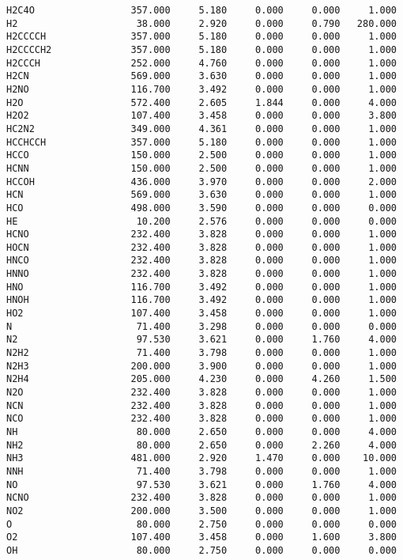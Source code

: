\begin{verbatim}
H2C4O                 357.000     5.180     0.000     0.000     1.000
H2                     38.000     2.920     0.000     0.790   280.000
H2CCCCH               357.000     5.180     0.000     0.000     1.000
H2CCCCH2              357.000     5.180     0.000     0.000     1.000
H2CCCH                252.000     4.760     0.000     0.000     1.000
H2CN                  569.000     3.630     0.000     0.000     1.000
H2NO                  116.700     3.492     0.000     0.000     1.000
H2O                   572.400     2.605     1.844     0.000     4.000
H2O2                  107.400     3.458     0.000     0.000     3.800
HC2N2                 349.000     4.361     0.000     0.000     1.000
HCCHCCH               357.000     5.180     0.000     0.000     1.000
HCCO                  150.000     2.500     0.000     0.000     1.000
HCNN                  150.000     2.500     0.000     0.000     1.000
HCCOH                 436.000     3.970     0.000     0.000     2.000
HCN                   569.000     3.630     0.000     0.000     1.000
HCO                   498.000     3.590     0.000     0.000     0.000
HE                     10.200     2.576     0.000     0.000     0.000
HCNO                  232.400     3.828     0.000     0.000     1.000
HOCN                  232.400     3.828     0.000     0.000     1.000
HNCO                  232.400     3.828     0.000     0.000     1.000
HNNO                  232.400     3.828     0.000     0.000     1.000
HNO                   116.700     3.492     0.000     0.000     1.000
HNOH                  116.700     3.492     0.000     0.000     1.000
HO2                   107.400     3.458     0.000     0.000     1.000
N                      71.400     3.298     0.000     0.000     0.000
N2                     97.530     3.621     0.000     1.760     4.000
N2H2                   71.400     3.798     0.000     0.000     1.000
N2H3                  200.000     3.900     0.000     0.000     1.000
N2H4                  205.000     4.230     0.000     4.260     1.500
N2O                   232.400     3.828     0.000     0.000     1.000
NCN                   232.400     3.828     0.000     0.000     1.000
NCO                   232.400     3.828     0.000     0.000     1.000
NH                     80.000     2.650     0.000     0.000     4.000
NH2                    80.000     2.650     0.000     2.260     4.000
NH3                   481.000     2.920     1.470     0.000    10.000
NNH                    71.400     3.798     0.000     0.000     1.000
NO                     97.530     3.621     0.000     1.760     4.000
NCNO                  232.400     3.828     0.000     0.000     1.000
NO2                   200.000     3.500     0.000     0.000     1.000
O                      80.000     2.750     0.000     0.000     0.000
O2                    107.400     3.458     0.000     1.600     3.800
OH                     80.000     2.750     0.000     0.000     0.000
\end{verbatim}
\nolinenumbers
